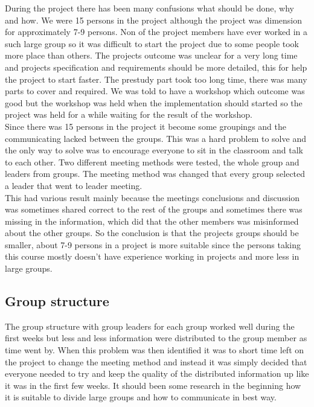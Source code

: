 
During the project there has been many confusions what should be done, why and how. We were 15 persons in the project although the project was dimension for approximately 7-9 persons. Non of the project members have ever worked in a such large group so it was difficult to start the project due to some people took more place than others. The projects outcome was unclear for a very long time and projects specification and requirements should be more detailed, this for help the project to start faster. The prestudy part took too long time, there was many parts to cover and required. We was told to have a workshop which outcome was good but the workshop was held when the implementation should started so the project was held for a while waiting for the result of the workshop.
\\
Since there was 15 persons in the project it become some groupings and the communicating lacked between the groups. This was a hard problem to solve and the only way to solve was to encourage everyone to sit in the classroom and talk to each other. Two different meeting methods were tested, the whole group and leaders from groups. The meeting method was changed that every group selected a leader that went to leader meeting.\\
 This had various result mainly because the meetings conclusions and discussion was sometimes shared correct to the rest of the groups and sometimes there was missing in the information, which did that the other members was misinformed about the other groups. So the conclusion is that the projects groups should be smaller, about 7-9 persons in a project is more suitable since the persons taking this course mostly doesn't have experience working in projects and more less in large groups.

\subsection{Group structure}
The group structure with group leaders for each group worked well during the first weeks but less and less information were distributed to the group member as time went by. When this problem was then identified it was to short time left on the project to change the meeting method and instead it was simply decided that everyone needed to try and keep the quality of the distributed information up like it was in the first few weeks. It should been some research in the beginning how it is suitable to divide large groups and how to communicate in best way.  \\

